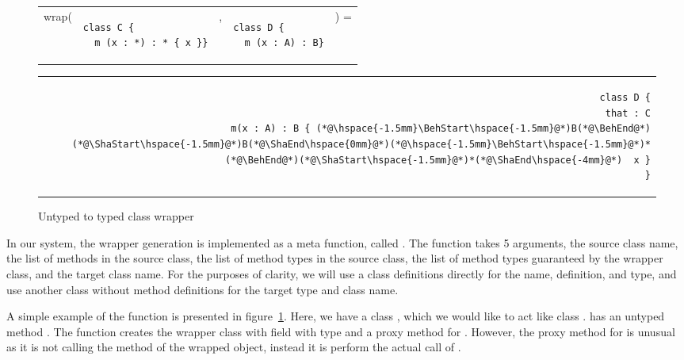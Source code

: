 \documentclass[a4paper,USenglish]{tex/lipics-v2016}
\begin{document}
\begin{figure}[!ht]
\begin{tabular}{ER{4.5cm}ER{3.5cm}E}
wrap( & 
\begin{lstlisting}
class C {
  m (x : *) : * { x }}
\end{lstlisting}& , &
\begin{lstlisting}
class D {
  m (x : A) : B}
\end{lstlisting}&) =
\end{tabular}
\begin{tabular}{@{}l@{}r@{}}
\hspace{4.8cm} \,&
\begin{minipage}{\textwidth-5cm}
\begin{lstlisting}
class D {
  that : C
  m(x : A) : B { (*@\hspace{-1.5mm}\BehStart\hspace{-1.5mm}@*)B(*@\BehEnd@*)(*@\ShaStart\hspace{-1.5mm}@*)B(*@\ShaEnd\hspace{0mm}@*)(*@\hspace{-1.5mm}\BehStart\hspace{-1.5mm}@*)*(*@\BehEnd@*)(*@\ShaStart\hspace{-1.5mm}@*)*(*@\ShaEnd\hspace{-4mm}@*)  x }
}
\end{lstlisting}
\end{minipage}
\end{tabular}
\caption{Untyped to typed class wrapper}
\label{fig:rktex1}
\end{figure}

In our system, the wrapper generation is implemented as a meta function, called
. The  function takes 5 arguments, the source class
name, the list of methods in the source class, the list of method types in the
source class, the list of method types guaranteed by the wrapper class,
and the target class name. For the purposes of clarity, we will use a class
definitions directly for the name, definition, and type, and use another class
without method definitions for the target type and class name.

A simple example of the  function is presented in figure~\ref{fig:rktex1}. 
Here, we have a class \C, which we would like to act like class \D. 
\C has an untyped method \m. The  function creates the wrapper class \D 
with \that field with type \D and a proxy method for \m. 
However, the proxy method for \m is unusual as it is not calling 
the method \m of the wrapped object, instead it is perform the actual call of \m. 
\end{document}
